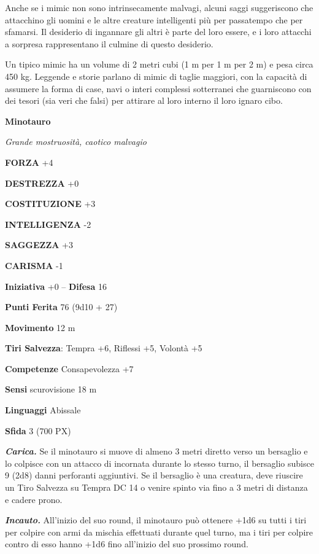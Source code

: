 \begin{multicols}{2}
	Anche se i mimic non sono intrinsecamente malvagi, alcuni saggi suggeriscono che attacchino gli uomini e le altre creature intelligenti più per passatempo che per sfamarsi. Il desiderio di ingannare gli altri è parte del loro essere, e i loro attacchi a sorpresa rappresentano il culmine di questo desiderio.

	Un tipico mimic ha un volume di 2 metri cubi (1 m per 1 m per 2 m) e pesa circa 450 kg. Leggende e storie parlano di mimic di taglie maggiori, con la capacità di assumere la forma di case, navi o interi complessi sotterranei che guarniscono con dei tesori (sia veri che falsi) per attirare al loro interno il loro ignaro cibo.


	\medskip{}\textbf{Minotauro}

	\textit{Grande mostruosità, caotico malvagio}

	\textbf{FORZA} +4

	\textbf{DESTREZZA} +0

	\textbf{COSTITUZIONE} +3

	\textbf{INTELLIGENZA} -2

	\textbf{SAGGEZZA} +3

	\textbf{CARISMA} -1

	\textbf{Iniziativa} +0 -- \textbf{Difesa} 16

	\textbf{Punti Ferita} 76 (9d10 + 27)

	\textbf{Movimento} 12 m

	\textbf{Tiri Salvezza}: Tempra +6, Riflessi +5, Volontà +5

	\textbf{Competenze} Consapevolezza +7

	\textbf{Sensi} scurovisione 18 m

	\textbf{Linguaggi} Abissale

	\textbf{Sfida} 3 (700 PX)

	\textit{\textbf{Carica.}} Se il minotauro si muove di almeno 3 metri diretto verso un bersaglio e lo colpisce con un attacco di incornata durante lo stesso turno, il bersaglio subisce 9 (2d8) danni perforanti aggiuntivi. Se il bersaglio è una creatura, deve riuscire un Tiro Salvezza su Tempra DC 14 o venire spinto via fino a 3 metri di distanza e cadere prono.

	\textit{\textbf{Incauto.}} All'inizio del suo round, il minotauro può ottenere +1d6 su tutti i tiri per colpire con armi da mischia effettuati durante quel turno, ma i tiri per colpire contro di esso hanno +1d6 fino all'inizio del suo prossimo round.


\end{multicols}
